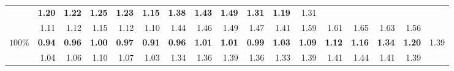 \begin{table}[htbp]
\begin{tabular}{|r|rrrrr|rrrrr|rrrrr|r|}
          & {\bf 1.20} & {\bf 1.22} & {\bf 1.25} & {\bf 1.23} & {\bf 1.15}   
          & {\bf 1.38} & {\bf 1.43} & {\bf 1.49} & {\bf 1.31} & {\bf 1.19} & 1.31 \\
        & 1.11 & 1.12 & 1.15 & 1.12 & 1.10   & 1.44 & 1.46 & 1.49 & 1.47 & 1.41   & 1.59 & 1.61 & 1.65 & 1.63 & 1.56 & \\ \hline
      $100\%$ &
            {\bf 0.94} & {\bf 0.96} & {\bf 1.00} & {\bf 0.97} & {\bf 0.91}   
          & {\bf 0.96} & {\bf 1.01} & {\bf 1.01} & {\bf 0.99} & {\bf 1.03}   
          & {\bf 1.09} & {\bf 1.12} & {\bf 1.16} & {\bf 1.34} & {\bf 1.20} & 1.39 \\
        & 1.04 & 1.06 & 1.10 & 1.07 & 1.03   & 1.34 & 1.36 & 1.39 & 1.36 & 1.33   & 1.39 & 1.41 & 1.44 & 1.41 & 1.39 & \\ \hline
  \end{tabular}
\end{table}
